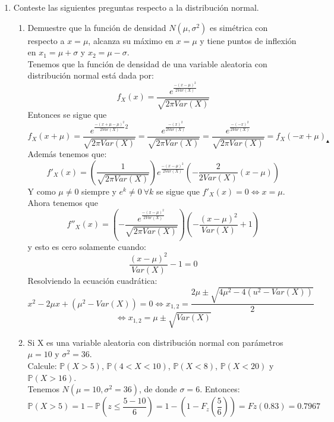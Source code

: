 \documentclass[11pt,a4paper]{report}
\begin{document}
\begin{enumerate}
{		}

		\item{
			Conteste las siguientes preguntas respecto a la distribución normal.
			\begin{enumerate}
				\item {
					Demuestre que la función de densidad $N(\mu, \sigma^2)$ es
                    simétrica con respecto a $x = \mu$, alcanza su máximo en
                    $x = \mu$ y tiene puntos de inflexión en $x_1= \mu + \sigma$
                    y $x_2 = \mu - \sigma$.\\
		    
		    Tenemos que la función de densidad de una variable aleatoria con distribución normal está dada por:
                    $$f_X (x) = \frac{e^{\frac{-(x-\mu)^2}{2 Var(X)}{ }}}{\sqrt{2\pi Var(X)}}$$ Entonces se sigue que 
                    $$f_X (x+\mu)=\frac{e^{\frac{-(x+\mu-\mu)^2}{2 Var(X)}{2 }}}{\sqrt{2\pi Var(X)}}=\frac{e^{\frac{-(x)^2}{2Var(X)}}}{\sqrt{2\pi Var(X)}}=\frac{e^{\frac{-(-x)^2}{2Var(X)}}}{\sqrt{2\pi Var(X)}}=f_X (-x+\mu)_{\blacktriangle}$$ 
                    Además tenemos que:\\
                    $$f'_X (x)= (\frac{1}{\sqrt{2\pi Var(X)}})e^{\frac{-(x-\mu)^2}{2Var(X)}}(-\frac{2}{2Var(X)}(x-\mu))$$
                    Y como $\mu \neq 0$ siempre y $e^{k}\neq 0 \ \forall k$ se sigue que $f'_X (x)=0 \Leftrightarrow x=\mu$. Ahora tenemos que $$f''_X (x)=(-\frac{e^{\frac{-(x-\mu)^2}{2Var(X)}}}{\sqrt{2 \pi Var(X)}})(-\frac{(x-\mu)^2}{Var(X)}+1)$$ y esto es cero solamente cuando:
                    $$\frac{(x-\mu)^2}{Var(X)}-1=0$$ Resolviendo la ecuación cuadrática:
                    $$x^2-2\mu x +(\mu^2-Var(X))=0 \Leftrightarrow x_{1,2}=\frac{2\mu \pm \sqrt{4\mu^2-4(u^2-Var(X))} }{2}$$ $$\Leftrightarrow x_{1,2}=\mu \pm \sqrt{Var(X)}$$
				}

				\item {
					Si X es una variable aleatoria con distribución normal con
                    parámetros $\mu = 10$ y $\sigma^2 = 36$.\\
                    Calcule: $\mathbb{P}(X > 5)$, $\mathbb{P}(4 < X < 10)$,
                    $\mathbb{P}(X < 8)$, $\mathbb{P}(X < 20)$ y
                    $\mathbb{P}(X > 16)$.\\

                    Tenemos  $N(\mu = 10, \sigma^2 = 36)$, de donde $\sigma = 6$.
                    Entonces:
                    \[ \mathbb{P}(X > 5) = 1 - \mathbb{P}(z \leq \frac{5-10}{6}) =1 - (1 -  F_z(\frac{5}{6})) =  Fz(0.83) = 0.7967 \]

}
\end{enumerate}}
\end{enumerate}
\end{document}
